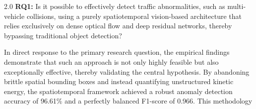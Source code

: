 \begin{spacing}{2.0}
\textbf{RQ1:} Is it possible to effectively detect traffic abnormalities, such as multi-vehicle collisions, using a purely spatiotemporal vision-based architecture that relies exclusively on dense optical flow and deep residual networks, thereby bypassing traditional object detection?

In direct response to the primary research question, the empirical findings demonstrate that such an approach is not only highly feasible but also exceptionally effective, thereby validating the central hypothesis. By abandoning brittle spatial bounding boxes and instead quantifying unstructured kinetic energy, the spatiotemporal framework achieved a robust anomaly detection accuracy of 96.61\% and a perfectly balanced F1-score of 0.966. This methodology

\end{spacing}